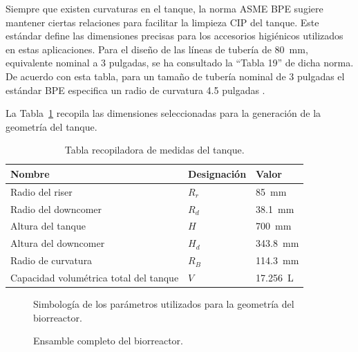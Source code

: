 \documentclass[11pt,tesis,twoside,openright,spanish]{upiiztt}
\begin{document}
Siempre que existen curvaturas en el tanque, la norma ASME BPE sugiere
mantener ciertas relaciones para facilitar la limpieza CIP del tanque. Este estándar
define las dimensiones precisas para los accesorios higiénicos utilizados en estas
aplicaciones. Para el diseño de las líneas de tubería de 80~mm, equivalente nominal
a 3 pulgadas, se ha consultado la ``Tabla 19'' de dicha norma. De acuerdo con esta
tabla, para un tamaño de tubería nominal de 3 pulgadas el estándar BPE especifica
un radio de curvatura 4.5 pulgadas \cite{Huitt2016}.

La Tabla~\ref{tab:medidas_tanque} recopila las dimensiones seleccionadas para la generación de la
geometría del tanque.

\begin{table}[H]
\centering
\caption{Tabla recopiladora de medidas del tanque.}
\label{tab:medidas_tanque}
\begin{tabular}{lll}
\toprule
\textbf{Nombre} & \textbf{Designación} & \textbf{Valor} \\
\midrule
Radio del riser          & $R_r$ & 85~mm \\
Radio del downcomer      & $R_d$ & 38.1~mm \\
Altura del tanque        & $H$   & 700~mm \\
Altura del downcomer     & $H_d$ & 343.8~mm \\
Radio de curvatura       & $R_B$ & 114.3~mm \\
Capacidad volumétrica total del tanque & $V$ & 17.256~L \\
\bottomrule
\end{tabular}
\end{table}

\begin{figure}[H]
  \centering
  \caption{Simbología de los parámetros utilizados para la geometría del biorreactor.}
  \label{fig:simbologia}
\end{figure}

\begin{figure}[H]
  \centering
  \caption{Ensamble completo del biorreactor.}
  \label{fig:ensamble_biorreactor}
\end{figure}
\end{document}
